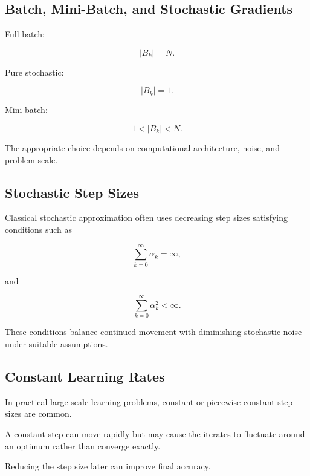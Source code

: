 \subsection{Batch, Mini-Batch, and Stochastic Gradients}
\label{subsec:batch-mini-stochastic}

Full batch:

\[
\boxed{
|B_k|=N.
}
\]

Pure stochastic:

\[
\boxed{
|B_k|=1.
}
\]

Mini-batch:

\[
\boxed{
1<|B_k|<N.
}
\]

The appropriate choice depends on computational architecture, noise, and
problem scale.

\subsection{Stochastic Step Sizes}
\label{subsec:stochastic-step-sizes}

Classical stochastic approximation often uses decreasing step sizes
satisfying conditions such as

\[
\boxed{
\sum_{k=0}^{\infty}
\alpha_k
=
\infty,
}
\]

and

\[
\boxed{
\sum_{k=0}^{\infty}
\alpha_k^2
<
\infty.
}
\]

These conditions balance continued movement with diminishing stochastic
noise under suitable assumptions.

\subsection{Constant Learning Rates}
\label{subsec:constant-learning-rates}

In practical large-scale learning problems, constant or piecewise-constant
step sizes are common.

A constant step can move rapidly but may cause the iterates to fluctuate
around an optimum rather than converge exactly.

Reducing the step size later can improve final accuracy.

